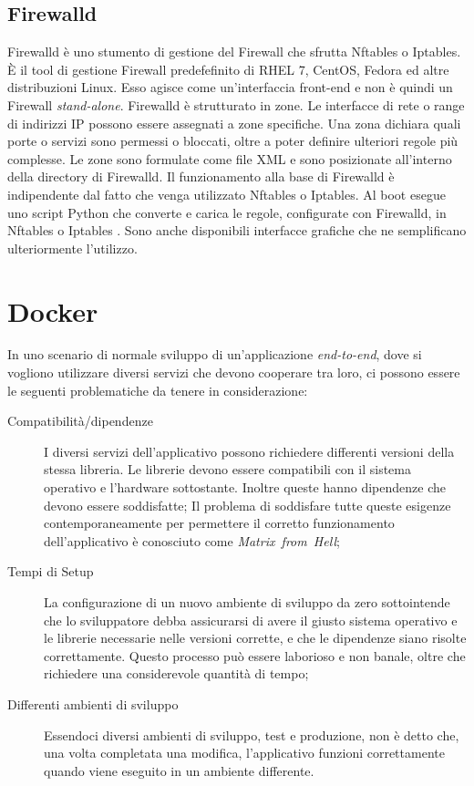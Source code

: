 \subsection{Firewalld}
\label{firewalld}
Firewalld \cite{firewalld} è uno stumento di gestione del Firewall che sfrutta  Nftables o Iptables. È il tool di gestione Firewall predefefinito di RHEL 7, CentOS, Fedora ed altre distribuzioni Linux. Esso agisce come  un'interfaccia front-end e non è quindi un Firewall \textit{stand-alone}.
Firewalld è strutturato in zone. Le interfacce di rete o range di indirizzi IP possono  essere assegnati a zone specifiche. Una zona  dichiara quali porte o servizi sono permessi o bloccati, oltre a poter definire ulteriori regole più complesse. Le zone sono formulate come file XML e sono posizionate all'interno della directory di Firewalld.
Il funzionamento alla base di Firewalld è indipendente dal fatto che venga utilizzato Nftables o Iptables. Al boot esegue uno script Python che converte e carica le regole, configurate con Firewalld, in Nftables o Iptables . Sono anche disponibili interfacce grafiche che ne semplificano ulteriormente l'utilizzo.

\section{Docker}
\label{docker}
In uno scenario di normale sviluppo di un'applicazione \textit{end-to-end}, dove si vogliono utilizzare diversi servizi che devono cooperare tra loro, ci possono essere le seguenti problematiche da tenere in considerazione:
\begin{description}
    \item[Compatibilità/dipendenze] I diversi servizi dell'applicativo possono richiedere differenti versioni della stessa libreria. Le librerie devono essere compatibili con il sistema operativo e l'hardware sottostante. Inoltre queste hanno dipendenze che devono essere soddisfatte;
    Il problema di soddisfare tutte queste esigenze contemporaneamente per permettere il corretto funzionamento dell'applicativo è conosciuto come \textit{Matrix~from~Hell};
    \item[Tempi di Setup] La configurazione di un nuovo ambiente di sviluppo da zero sottointende che lo sviluppatore debba assicurarsi di avere il giusto sistema operativo e le librerie necessarie nelle versioni corrette, e che le dipendenze siano risolte correttamente. Questo processo può essere laborioso e non banale,  oltre che richiedere una considerevole quantità di tempo;
    \item[Differenti ambienti di sviluppo] Essendoci diversi ambienti di sviluppo, test e produzione, non è detto che, una volta completata una modifica,  l'applicativo funzioni correttamente quando viene eseguito in un ambiente differente.
\end{description}

